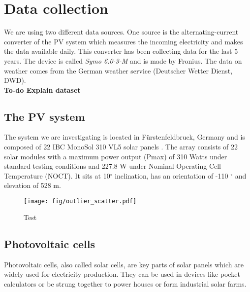 \documentclass{article}
\begin{document}
\section{Data collection}
We are using two different data sources. One source is the alternating-current converter of the PV system which measures the incoming electricity and makes the data available daily.
This converter has been collecting data for the last 5 years. The device is called \textit{Symo 6.0-3-M} and is made by Fronius.
The data on weather comes from the German weather service (Deutscher Wetter Dienst, DWD).\\
\textbf{To-do Explain dataset}\\
\subsection{The PV system}
The system we are investigating is located in Fürstenfeldbruck, Germany and is composed of 22 IBC MonoSol 310 VL5 solar panels \cite{MonoSol}.
The array consists of 22 solar modules with a maximum power output (Pmax) of 310 Watts under standard testing conditions and 227.8 W  under Nominal Operating Cell Temperature (NOCT).
It sits at 10$^\circ$ inclination, has an orientation of -110 $^\circ$ and elevation of 528 m.
\begin{figure*}
	\texttt{[image: fig/outlier\_scatter.pdf]}
	\caption{Test}
\end{figure*}

\subsection{Photovoltaic cells}\label{sec:pv}

Photovoltaic cells, also called solar cells, are key parts of solar panels which are widely used for electricity production. They can be used in devices like pocket calculators or be strung together to power houses or form industrial solar farms.\\
\end{document}
